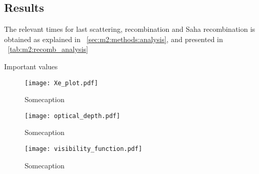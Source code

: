 \subsection{Results}\label{sec:m2:results} 

    The relevant times for last scattering, recombination and Saha recombination is obtained as explained in ~\cref{sec:m2:methods:analysis}, and presented in ~\cref{tab:m2:recomb_analysis}
    \begin{table}
        
        \caption{Important values}
        \label{tab:m2:recomb_analysis}
    \end{table}

    \begin{figure}
        \texttt{[image: Xe\_plot.pdf]}
        \caption{Somecaption}
        \label{fig:m2:electron_fraction}
    \end{figure}

    \begin{figure}
        \texttt{[image: optical\_depth.pdf]}
        \caption{Somecaption}
        \label{fig:m2:optical_depth}
    \end{figure}

    \begin{figure}
        \texttt{[image: visibility\_function.pdf]}
        \caption{Somecaption}
        \label{fig:m2:visibility_function}
    \end{figure}


